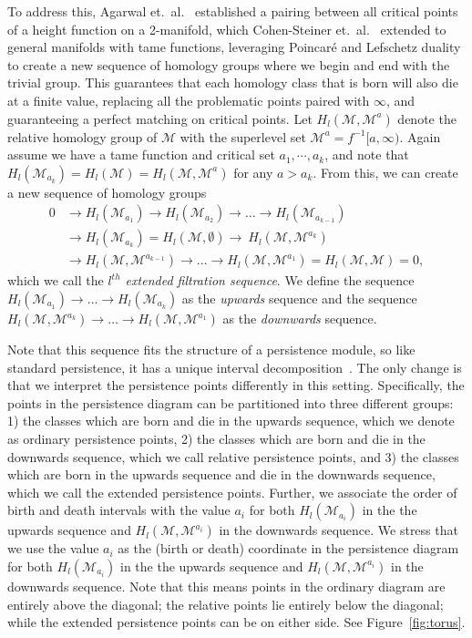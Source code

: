 \documentclass[twoside,leqno]{article}
\newcommand{\M}{\mathcal{M}}
\begin{document}
To address this, Agarwal et.~al.~\cite{Agarwal2006} established a pairing between all critical points of a height function on a 2-manifold, which Cohen-Steiner et.~al.~\cite{CohenSteiner2008} extended to general manifolds with tame functions, leveraging Poincar\'{e} and Lefschetz duality to create a new sequence of homology groups where we begin and end with the trivial group. This guarantees that each homology class that is born will also die at a finite value, replacing all the problematic points paired with $\infty$, and guaranteeing a perfect matching on critical points. 
Let $H_{l}(\M,\M^a)$ denote the relative homology group of $\M$ with the superlevel set $\M^a = f^{-1}[a,\infty)$. 
Again assume we have a tame function %
and critical set $a_1,\cdots,a_k$, and note that $H_{l}(\M_{a_k}) = H_{l}(\M) = H_{l}(\M,\M^a)$ for any $a >a_k$.
From this, we can create a new sequence of homology groups
\begin{align}
    0 & \rightarrow H_{ l}(\M_{a_1}) \rightarrow H_{l}(\M_{a_2}) \rightarrow \ldots \rightarrow H_{ l}(\M_{a_{k-1}}) 
    \nonumber
    \\
    &  \rightarrow H_{l}(\M_{a_k})  = H_{l}(\M,\emptyset) \rightarrow \ H_{l}(\M,\M^{a_k}) 
    \nonumber
    \\
    & \rightarrow H_{ l}(\M,\M^{a_{k-1}}) \rightarrow \ldots \rightarrow H_{l}(\M,\M^{a_1}) = H_{l}(\M,\M) = 0,
    \label{Eq:ExactSequence}
\end{align}
which we call the \emph{$l^{th}$ extended filtration sequence}. We define the sequence $H_{l}(\M_{a_1}) \rightarrow \ldots \rightarrow H_{l}(\M_{a_k})$ as the \emph{upwards} sequence and the sequence 
$H_{l}(\M,\M^{a_k}) \rightarrow \ldots \rightarrow H_{l}(\M,\M^{a_1})$ as the \emph{downwards} sequence.

Note that this sequence fits the structure of a persistence module, so like standard persistence, it has a unique interval decomposition~\cite{CrawleyBoevey2015}. 
The only change is that we interpret the persistence points differently in this setting. 
Specifically, the points in the persistence diagram can be partitioned into three different groups: 1) the classes which are born and die in the upwards sequence, which we denote as ordinary persistence points, 2) the classes which are born and die in the downwards sequence, which we call relative persistence points,  and 3) the classes which are born in the upwards sequence and die in the downwards sequence, which we call the extended persistence points.
Further, we associate the order of birth and death intervals with the value $a_i$ for both $H_{ l}(\M_{a_i})$ in the the upwards sequence and $H_{l}(\M,\M^{a_i})$ in the downwards sequence.
We stress that we use the value $a_i$ as the (birth or death) coordinate in the persistence diagram for both $H_l(\M_{a_i})$ in the the upwards sequence and $H_l(\M,\M^{a_i})$ in the downwards sequence.
%
%
%
%
%
%
%
%
%
%
%
%
%
%
%
%
%
%
%
Note that this means points in the ordinary diagram are entirely above the diagonal; the relative points lie entirely below the diagonal; while the extended persistence points can be on either side.
See Figure~\ref{fig:torus}.
\end{document}
